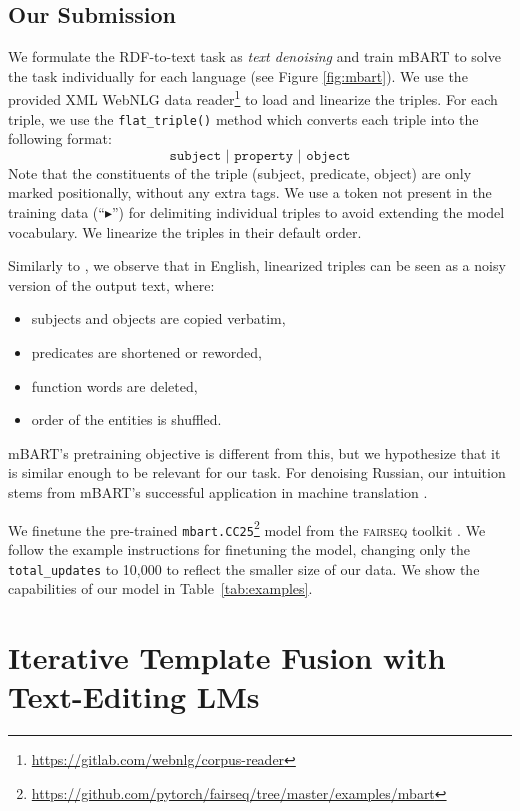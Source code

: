 \subsection{Our Submission}
\label{sec:mbart}
We formulate the RDF-to-text task as \textit{text denoising} and train mBART to solve the task individually for each language (see Figure \ref{fig:mbart}).
We use the provided XML WebNLG data reader\footnote{\url{https://gitlab.com/webnlg/corpus-reader}} to load and linearize the triples. For each triple, we use the \texttt{flat\_triple()} method which converts each triple into the following format:
$$
    \texttt{subject $\vert$ property $\vert$ object}
$$
Note that the constituents of the triple (subject, predicate, object) are only marked positionally, without any extra tags. We use a token not present in the training data (“$\blacktriangleright$”) for delimiting individual triples to avoid extending the model vocabulary. We linearize the triples in their default order.

Similarly to \citet{freitag_unsupervised_2018}, we observe that in English, linearized triples can be seen as a noisy version of the output text, where:
\begin{itemize}[parsep=0pt,itemsep=1pt,topsep=1pt]
    \setlength\itemsep{0.1cm}
    \item subjects and objects are copied verbatim,
    \item predicates are shortened or reworded,
    \item function words are deleted,
    \item order of the entities is shuffled.
\end{itemize}
mBART's pretraining objective is different from this, but we hypothesize that it is similar enough to be relevant for our task.
For denoising Russian, our intuition stems from mBART's successful application in machine translation \citep{liu2020multilingual}.

We finetune the pre-trained \texttt{mbart.CC25}\footnote{\url{https://github.com/pytorch/fairseq/tree/master/examples/mbart}} model from the \textsc{fairseq} toolkit \citep{ott2019fairseq}.
We follow the example instructions for finetuning the model, changing only the \texttt{total\_updates} to 10,000 to reflect the smaller size of our data.  We show the capabilities of our model in Table~\ref{tab:examples}.



\section{Iterative Template Fusion with Text-Editing LMs}
\label{sec:iterative}
